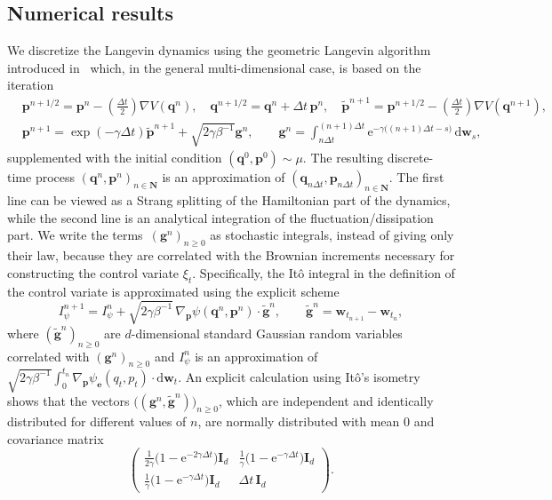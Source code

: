 \documentclass[11pt,a4paper]{article}
\newcommand{\e}{\mathrm{e}}
\newcommand{\nat}{\mathbf N}
\newcommand{\grad}{\nabla}
\newcommand{\vect}[1]{\boldsymbol{\mathbf #1}}
\newcommand{\mat}[1]{\vect #1}
\renewcommand{\d}{\mathrm d}
\theoremstyle{plain}
\numberwithin{equation}{section}
\renewcommand{\geq}{\geqslant}
\begin{document}
\subsection{Numerical results}%
\label{sub:numerical_results}
We discretize the Langevin dynamics using the geometric Langevin algorithm introduced in~\cite{MR2608370} which,
in the general multi-dimensional case, is based on the iteration
\begin{align*}
    & \vect p^{n+1/2} = \vect p^n - \left(\frac{\Delta t}{2}\right) \grad V(\vect q^n),
    \quad \vect q^{n+1/2} = \vect q^n + \Delta t \, \vect p^n,
    \quad \widetilde {\vect p}^{n+1} = \vect p^{n+1/2} - \left(\frac{\Delta t}{2}\right) \grad V(\vect q^{n+1}), \\
    & \vect p^{n+1} = \exp \left(- \gamma \Delta t \right) \widetilde {\vect p}^{n+1}
    + \sqrt{2 \gamma \beta^{-1}} \vect g^n, \qquad \vect g^n = \int_{n \Delta t}^{(n+1)\Delta t} \e^{-\gamma \bigl((n+1)\Delta t-s\bigr)} \, \d \vect w_s,
\end{align*}
supplemented with the initial condition $(\vect q^0, \vect p^0) \sim \mu$.
The resulting discrete-time process $(\vect q^n, \vect p^n)_{n \in \nat}$ is an approximation of $(\vect q_{n \Delta t}, \vect p_{n \Delta t})_{n \in \nat}$.
The first line can be viewed as a Strang splitting of the Hamiltonian part of the dynamics,
while the second line is an analytical integration of the fluctuation/dissipation part.
We write the terms~$(\vect g^n)_{n\geq0}$ as stochastic integrals, instead of giving only their law,
because they are correlated with the Brownian increments necessary for constructing the control variate $\xi_t$.
Specifically, the It\^o integral in the definition of the control variate is approximated using the explicit scheme
\[
    I_{\psi}^{n+1} = I_{\psi}^n + \sqrt{2 \gamma \beta^{-1}} \, \grad_{\vect p} \psi(\vect q^{n}, \vect p^{n}) \cdot
    \widetilde {\vect g}^n, \qquad \widetilde {\vect g}^n = \vect w_{t_{n+1}} - \vect w_{t_n},
\]
where $(\widetilde {\vect g}^n)_{n \geq 0}$ are $d$-dimensional standard Gaussian random variables correlated with $(\vect g^n)_{n \geq 0}$
and $I_{\psi}^{n}$ is an approximation of $\sqrt{2 \gamma \beta^{-1}} \int_{0}^{t_n} \grad_{\vect p} \psi_{\vect e}(q_t, p_t) \cdot \d \vect w_t$.
An explicit calculation using It\^o's isometry shows that the vectors $\bigl((\vect g^n, \widetilde {\vect g}^n)\bigr)_{n \geq 0}$,
which are independent and identically distributed for different values of $n$,
are normally distributed with mean 0 and covariance matrix
\[
    \begin{pmatrix}
        \displaystyle \frac{1}{2 \gamma} \bigl(1 - \e^{-2 \gamma \Delta t}\bigr) \mat I_d
        & \displaystyle \frac{1}{\gamma}\bigl(1 - \e^{-\gamma \Delta t}\bigr) \mat I_d \\
        \displaystyle  \frac{1}{\gamma}\bigl(1 - \e^{-\gamma \Delta t}\bigr) \mat I_d
        & \displaystyle \Delta t \, \mat I_d
    \end{pmatrix}.
\]
\end{document}
